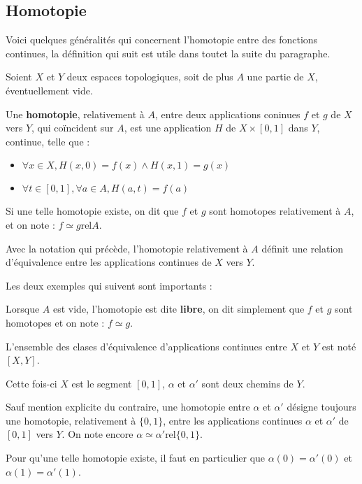 \subsection{Homotopie}

Voici quelques g\'en\'eralit\'es qui concernent l'homotopie entre des fonctions continues, la d\'efinition qui suit est utile dans toutet la suite du paragraphe.

\begin{defi}
Soient $X$ et $Y$ deux espaces topologiques, soit de plus $A$ une partie de $X$, \'eventuellement vide.

Une \textbf{homotopie}, relativement \`a $A$, entre deux applications coninues $f$ et $g$ de $X$ vers $Y$, %
qui co\"incident sur $A$, %
est une application $H$ de $X\times [0,1]$ dans $Y$, continue, telle que :
\begin{itemize}
\item $\forall x \in X, H(x,0)=f(x) \wedge H(x,1)=g(x)$
\item $\forall t \in [0,1] , \forall a \in A , H(a,t)=f(a)$
\end{itemize}
Si une telle homotopie existe, on dit que $f$ et $g$ sont homotopes relativement \`a $A$, %
et on note : $f\simeq g \text{rel} A$.
\end{defi}

\begin{prop}
Avec la notation qui pr\'ec\`ede, l'homotopie relativement \`a $A$ d\'efinit une relation d'\'equivalence entre les applications continues de $X$ vers $Y$.
\end{prop}

Les deux exemples qui suivent sont importants :

\begin{exem}
Lorsque $A$ est vide, l'homotopie est dite \textbf{libre}, on dit simplement que $f$ et $g$ sont homotopes et on note : $f\simeq g$.

L'ensemble des clases d'\'equivalence d'applications continues entre $X$ et $Y$ est not\'e $[X,Y]$.
\end{exem}

\begin{exem}
Cette fois-ci $X$ est le segment $[0,1]$, $\alpha$ et $\alpha '$ sont deux chemins de $Y$.

Sauf mention explicite du contraire, une homotopie entre $\alpha$ et $\alpha '$ d\'esigne toujours une homotopie, relativement \`a $\{0,1\}$, %
entre les applications continues $\alpha$ et $\alpha '$ de $[0,1]$ vers $Y$. On note encore $\alpha\simeq\alpha ' \text{rel}\{0,1\}$.

Pour qu'une telle homotopie existe, il faut en particulier que $\alpha(0)=\alpha '(0)$ et $\alpha(1)=\alpha '(1)$.
\end{exem}

